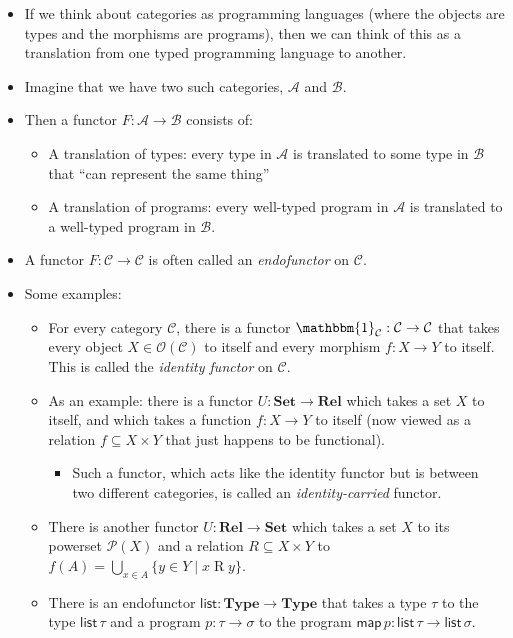 \documentclass{lecturenotes}
\newcommand{\obj}[1]{\ensuremath{\mathcal{O}(#1)}}
\newcommand{\id}[1][]{\ensuremath{\mathbbm{1}_{#1}}}
\newcommand{\Set}{\textbf{Set}\xspace}
\newcommand{\Rel}{\textbf{Rel}\xspace}
\newcommand{\Type}{\textbf{Type}\xspace}
\begin{document}
\begin{itemize}
\item If we think about categories as programming languages (where the objects are types and the morphisms are programs), then we can think of this as a translation from one typed programming language to another.
\item Imagine that we have two such categories, $\mathcal{A}$ and $\mathcal{B}$.
\item Then a functor $F : \mathcal{A} \to \mathcal{B}$ consists of:
  \begin{itemize}
  \item A translation of types: every type in $\mathcal{A}$ is translated to some type in $\mathcal{B}$ that ``can represent the same thing''
  \item A translation of programs: every well-typed program in $\mathcal{A}$ is translated to a well-typed program in $\mathcal{B}$.
  \end{itemize}
\item A functor $F : \mathcal{C} \to \mathcal{C}$ is often called an \emph{endofunctor} on $\mathcal{C}$.
\item Some examples:
  \begin{itemize}
  \item For every category $\mathcal{C}$, there is a functor $\id[\mathcal{C}] : \mathcal{C} \to \mathcal{C}$ that takes every object $X \in \obj{\mathcal{C}}$ to itself and every morphism $f : X \to Y$ to itself.
    This is called the \emph{identity functor} on $\mathcal{C}$.
  \item As an example: there is a functor $U : \Set \to \Rel$ which takes a set $X$ to itself, and which takes a function $f : X \to Y$ to itself (now viewed as a relation $f \subseteq X \times Y$ that just happens to be functional).
    \begin{itemize}
    \item Such a functor, which acts like the identity functor but is between two different categories, is called an \emph{identity-carried} functor.
    \end{itemize}
    \newpage
  \item There is another functor $U : \Rel \to \Set$ which takes a set $X$ to its powerset $\mathcal{P}(X)$ and a relation $R \subseteq X \times Y$ to $f(A) = \bigcup_{x \in A} \{y \in Y \mid x \mathrel{R} y\}$.
  \item There is an endofunctor $\textsf{list} : \Type \to \Type$ that takes a type $\tau$ to the type $\textsf{list}\,\tau$ and a program $p : \tau \to \sigma$ to the program $\textsf{map}\,p : \textsf{list}\,\tau \to \textsf{list}\,\sigma$.

\end{itemize}
\end{itemize}
\end{document}
